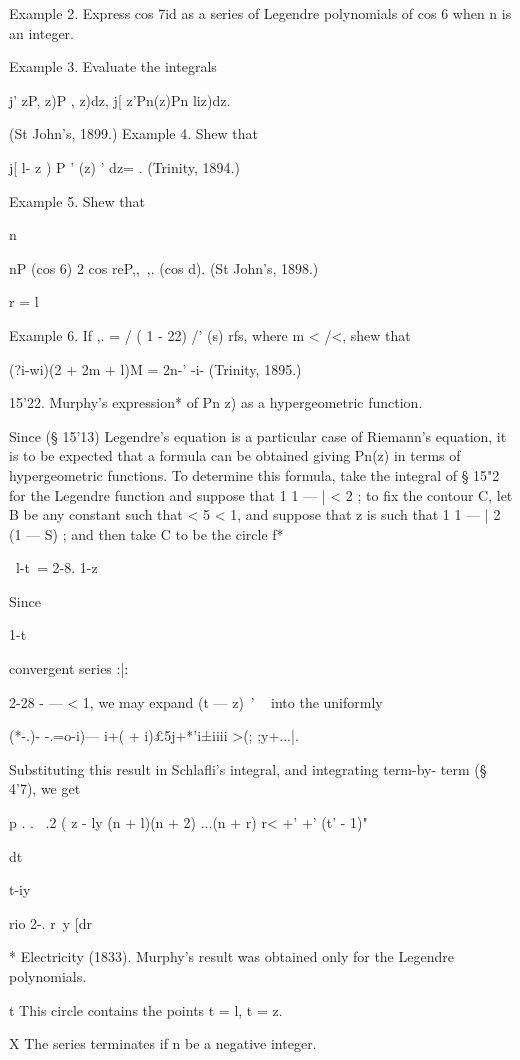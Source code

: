 {{Example 2. Express cos 7id as a series of Legendre polynomials of cos
6 when n is an integer.

Example 3. Evaluate the integrals

j' zP, z)P , z)dz, j[ z'Pn(z)Pn liz)dz.

(St John's, 1899.) Example 4. Shew that

j[ l- z ) P ' (z) ' dz= . (Trinity, 1894.)

Example 5. Shew that

n

nP (cos 6) 2 cos reP,,\ ,. (cos d). (St John's, 1898.)

r = l

Example 6. If ,. = / ( 1 - 22) /' (s) rfs, where m < /<, shew that

(?i-wi)(2 + 2m + l)M = 2n-' -i- (Trinity, 1895.)

15'22. Murphy's expression* of Pn z) as a hypergeometric function.

Since (§ 15'13) Legendre's equation is a particular case of Riemann's
equation, it is to be expected that a formula can be obtained giving
Pn(z) in terms of hypergeometric functions. To determine this formula,
take the integral of § 15"2 for the Legendre function and suppose that
1 1 — | < 2 ; to fix the contour C, let B be any constant such that <
5 < 1, and suppose that z is such that 1 1 — | 2 (1 — S) ; and then
take C to be the circle f*

\ l-t\ = 2-8. 1-z

Since

1-t

convergent series :|:

2-28 - — < 1, we may expand (t — z)~' ~ into the uniformly

(*-.)- -.=o-i)— i+( + i)£5j+*'i±iiii >(; ;y+...|.

Substituting this result in Schlafli's integral, and integrating
term-by- term (§ 4'7), we get

p . . \ .2 ( z - ly (n + l)(n + 2) ...(n + r) r< +' +' (t' - 1)"

dt

 t-iy

rio 2-. r\ y [dr

* Electricity (1833). Murphy's result was obtained only for the
Legendre polynomials.

t This circle contains the points t = l, t = z.

X The series terminates if n be a negative integer.

}}
